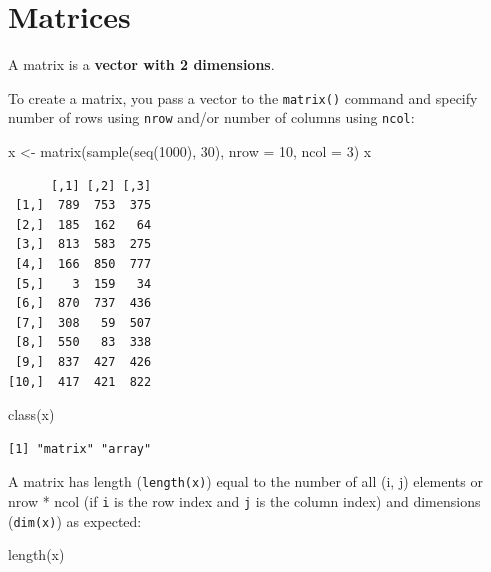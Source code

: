 \documentclass[
]{book}
\makeatletter
\newenvironment{Shaded}{\begin{snugshade}}{\end{snugshade}}
\newcommand{\AttributeTok}[1]{\textcolor[rgb]{0.77,0.63,0.00}{#1}}
\newcommand{\DecValTok}[1]{\textcolor[rgb]{0.00,0.00,0.81}{#1}}
\newcommand{\FunctionTok}[1]{\textcolor[rgb]{0.00,0.00,0.00}{#1}}
\newcommand{\NormalTok}[1]{#1}
\newcommand{\OtherTok}[1]{\textcolor[rgb]{0.56,0.35,0.01}{#1}}
\newenvironment{kframe}{%
\medskip{}
\setlength{\fboxsep}{.8em}
 \def\at@end@of@kframe{}%
 \ifinner\ifhmode%
  \def\at@end@of@kframe{\end{minipage}}%
  \begin{minipage}{\columnwidth}%
 \fi\fi%
 \def\FrameCommand##1{\hskip\@totalleftmargin \hskip-\fboxsep
 \colorbox{shadecolor}{##1}\hskip-\fboxsep
     \hskip-\linewidth \hskip-\@totalleftmargin \hskip\columnwidth}%
 \MakeFramed {\advance\hsize-\width
   \@totalleftmargin\z@ \linewidth\hsize
   \@setminipage}}%
 {\par\unskip\endMakeFramed%
 \at@end@of@kframe}
\newenvironment{rmdblock}[1]
  {
  \begin{itemize}
  \renewcommand{\labelitemi}{
    \raisebox{-.7\height}[0pt][0pt]{
      {\setkeys{Gin}{width=3em,keepaspectratio}\texttt{[image: images/\#1]}}
    }
  }
  \setlength{\fboxsep}{1em}
  \begin{kframe}
  \item
  }
  {
  \end{kframe}
  \end{itemize}
  }
\newenvironment{note}
  {\begin{rmdblock}{note}}
  {\end{rmdblock}}
\makeatother
\begin{document}
\hypertarget{matrices}{%
\section{Matrices}\label{matrices}}

A matrix is a \textbf{vector with 2 dimensions}.

To create a matrix, you pass a vector to the \texttt{matrix()} command and specify number of rows using \texttt{nrow} and/or number of columns using \texttt{ncol}:

\begin{Shaded}
\begin{Highlighting}[]
\NormalTok{x }\OtherTok{\textless{}{-}} \FunctionTok{matrix}\NormalTok{(}\FunctionTok{sample}\NormalTok{(}\FunctionTok{seq}\NormalTok{(}\DecValTok{1000}\NormalTok{), }\DecValTok{30}\NormalTok{),}
            \AttributeTok{nrow =} \DecValTok{10}\NormalTok{, }\AttributeTok{ncol =} \DecValTok{3}\NormalTok{)}
\NormalTok{x}
\end{Highlighting}
\end{Shaded}

\begin{verbatim}
      [,1] [,2] [,3]
 [1,]  789  753  375
 [2,]  185  162   64
 [3,]  813  583  275
 [4,]  166  850  777
 [5,]    3  159   34
 [6,]  870  737  436
 [7,]  308   59  507
 [8,]  550   83  338
 [9,]  837  427  426
[10,]  417  421  822
\end{verbatim}

\begin{Shaded}
\begin{Highlighting}[]
\FunctionTok{class}\NormalTok{(x)}
\end{Highlighting}
\end{Shaded}

\begin{verbatim}
[1] "matrix" "array" 
\end{verbatim}

\begin{note}
A matrix has length (\texttt{length(x)}) equal to the number of all (i,
j) elements or nrow * ncol (if \texttt{i} is the row index and
\texttt{j} is the column index) and dimensions (\texttt{dim(x)}) as
expected:
\end{note}

\begin{Shaded}
\begin{Highlighting}[]
\FunctionTok{length}\NormalTok{(x)}
\end{Highlighting}
\end{Shaded}
\end{document}
